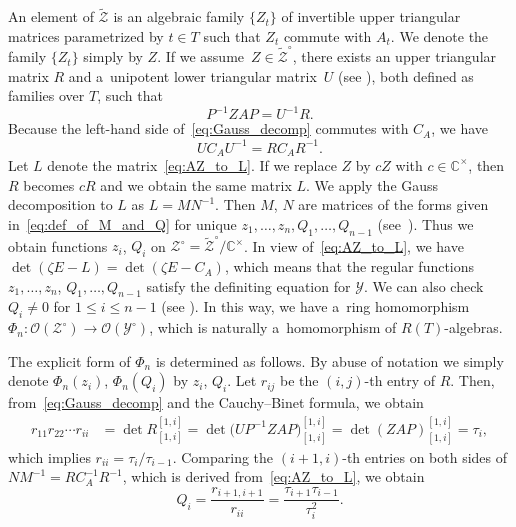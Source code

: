 \documentclass[10pt,a4paper]{amsart}
\numberwithin{equation}{section}
\newcommand{\C}{\mathbb{C}}
\newcommand{\Rep}{{R(T)}}
\theoremstyle{definition}
\begin{document}
An element of $\tilde{\mathscr{Z}}$
is an algebraic family $\{Z_t\}$ of invertible
upper triangular matrices
parame\-trized by $t\in T$ such that $Z_t$ commute with $A_t$.
We denote the family $\{Z_t\}$ simply by $Z$.
If we assume~${Z\in \tilde{\mathscr{Z}}^\circ}$,
there exists
an upper triangular matrix $R$
and a~unipotent lower triangular matrix~$U$ (see \cite[Proposition 3.2]{IIM}), both defined as families over $T$, such that \begin{equation}\label{eq:Gauss_decomp}
P^{-1}ZAP=U^{-1}R.
\end{equation}
Because the left-hand side of~\eqref{eq:Gauss_decomp} commutes with $C_A$, we have
\begin{equation}\label{eq:AZ_to_L} UC_AU^{-1}=RC_AR^{-1}.
\end{equation}
Let $L$ denote the matrix~\eqref{eq:AZ_to_L}.
If we replace $Z$ by $cZ$ with $c\in \C^\times$,
then $R$ becomes $cR$ and we obtain the same matrix $L$.
We apply the Gauss decomposition to
$L$ as $L=MN^{-1}$. Then $M$, $N$ are matrices of the forms given in~\eqref{eq:def_of_M_and_Q} for unique $z_1,\dots,z_n, Q_1,\dots,Q_{n-1}$ (see~\cite[Section~3.2]{IIM}).
Thus we obtain
functions
$z_i$, $Q_i$
on $\mathscr{Z}^\circ=\tilde{\mathscr{Z}}^\circ/\C^{\times}$.
In view of~\eqref{eq:AZ_to_L},
we have~${\det(\zeta E-L)
=\det(\zeta E-C_A)}$, which means that
the regular functions $z_1,\dots,z_n$, $Q_1,\dots,\allowbreak Q_{n-1}$
satisfy the definiting equation for $\mathscr{Y}$.
We can also check $Q_i\ne 0$
for $1\le i\le n-1$ (see \cite[Section~3.5]{IIM}).
In this way, we have a~ring homomorphism
$\Phi_n\colon \mathscr{O}(\mathscr{Z}^\circ)\rightarrow\mathscr{O}(\mathscr{Y}^\circ)$, which is naturally a~homomorphism of $\Rep$-algebras.

The explicit form of $\Phi_n$
is determined as follows.
By abuse of notation
we simply denote $\Phi_n(z_i)$, $\Phi_n(Q_i)$ by $z_i$, $Q_i$.
Let $r_{ij}$ be the $(i,j)$-th entry of $R$.
Then, from~\eqref{eq:Gauss_decomp} and the Cauchy--Binet formula, we obtain
\begin{equation}\label{eq:r_to_minor}
\begin{aligned}
r_{11}r_{22}\cdots r_{ii}
&=
\det R^{[1,i]}_{[1,i]}=
\det\bigl(UP^{-1}ZAP\bigr)^{[1,i]}_{[1,i]}
=\det(ZAP)^{[1,i]}_{[1,i]}=\tau_i,
\end{aligned}
\end{equation}
which implies $r_{ii}=\tau_{i}/\tau_{i-1}$.
Comparing the $(i+1,i)$-th entries on both sides of
$
NM^{-1}=RC_A^{-1}R^{-1}
$, which is derived from~\eqref{eq:AZ_to_L}, we obtain
\begin{equation}\label{eq:Q_to_tau}
Q_i=\frac{r_{i+1,i+1}}{r_{ii}}=\frac{\tau_{i+1}\tau_{i-1}}{\tau_i^2}.
\end{equation}
\end{document}
